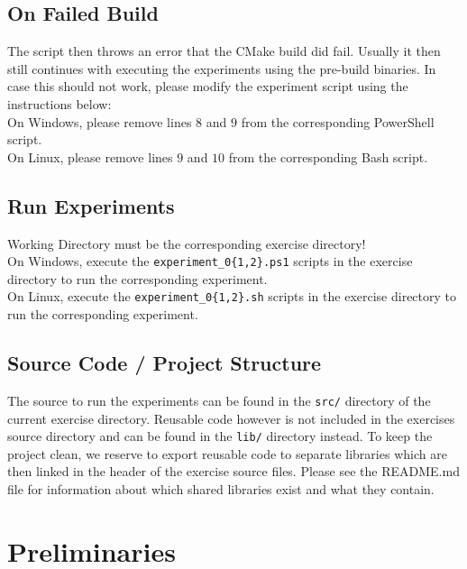 \documentclass[twocolumn]{article}
\begin{document}
\subsection{On Failed Build}
The script then throws an error that the CMake build did fail.
Usually it then still continues with executing the experiments using the pre-build binaries.
In case this should not work, please modify the experiment script using the instructions below:\\
On Windows, please remove lines $8$ and $9$ from the corresponding PowerShell script.\\
On Linux, please remove lines $9$ and $10$ from the corresponding Bash script.

\subsection{Run Experiments}
Working Directory must be the corresponding exercise directory!\\
On Windows, execute the \texttt{experiment\_0\{1,2\}.ps1} scripts in the exercise directory to run the corresponding experiment.\\
On Linux, execute the \texttt{experiment\_0\{1,2\}.sh} scripts in the exercise directory to run the corresponding experiment.\\

\subsection{Source Code / Project Structure}
The source to run the experiments can be found in the \texttt{src/} directory of the current exercise directory. 
Reusable code however is not included in the exercises source directory and can be found in the \texttt{lib/} directory instead. 
To keep the project clean, we reserve to export reusable code to separate libraries which are then linked in the header of the exercise source files. 
Please see the README.md file for information about which shared libraries exist and what they contain.

\section{Preliminaries}
\end{document}
